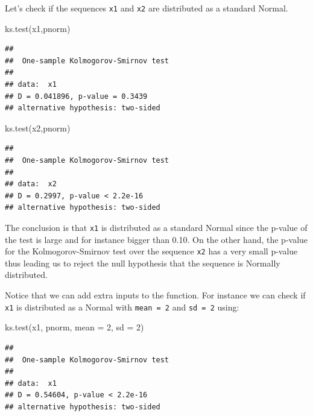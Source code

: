 \documentclass[
]{book}
\newenvironment{Shaded}{\begin{snugshade}}{\end{snugshade}}
\newcommand{\AttributeTok}[1]{\textcolor[rgb]{0.77,0.63,0.00}{#1}}
\newcommand{\DecValTok}[1]{\textcolor[rgb]{0.00,0.00,0.81}{#1}}
\newcommand{\FunctionTok}[1]{\textcolor[rgb]{0.00,0.00,0.00}{#1}}
\newcommand{\NormalTok}[1]{#1}
\begin{document}
Let's check if the sequences \texttt{x1} and \texttt{x2} are distributed as a standard Normal.

\begin{Shaded}
\begin{Highlighting}[]
\FunctionTok{ks.test}\NormalTok{(x1,pnorm)}
\end{Highlighting}
\end{Shaded}

\begin{verbatim}
## 
##  One-sample Kolmogorov-Smirnov test
## 
## data:  x1
## D = 0.041896, p-value = 0.3439
## alternative hypothesis: two-sided
\end{verbatim}

\begin{Shaded}
\begin{Highlighting}[]
\FunctionTok{ks.test}\NormalTok{(x2,pnorm)}
\end{Highlighting}
\end{Shaded}

\begin{verbatim}
## 
##  One-sample Kolmogorov-Smirnov test
## 
## data:  x2
## D = 0.2997, p-value < 2.2e-16
## alternative hypothesis: two-sided
\end{verbatim}

The conclusion is that \texttt{x1} is distributed as a standard Normal since the p-value of the test is large and for instance bigger than 0.10. On the other hand, the p-value for the Kolmogorov-Smirnov test over the sequence \texttt{x2} has a very small p-value thus leading us to reject the null hypothesis that the sequence is Normally distributed.

Notice that we can add extra inputs to the function. For instance we can check if \texttt{x1} is distributed as a Normal with \texttt{mean\ =\ 2} and \texttt{sd\ =\ 2} using:

\begin{Shaded}
\begin{Highlighting}[]
\FunctionTok{ks.test}\NormalTok{(x1, pnorm, }\AttributeTok{mean =} \DecValTok{2}\NormalTok{, }\AttributeTok{sd =} \DecValTok{2}\NormalTok{)}
\end{Highlighting}
\end{Shaded}

\begin{verbatim}
## 
##  One-sample Kolmogorov-Smirnov test
## 
## data:  x1
## D = 0.54604, p-value < 2.2e-16
## alternative hypothesis: two-sided
\end{verbatim}
\end{document}
